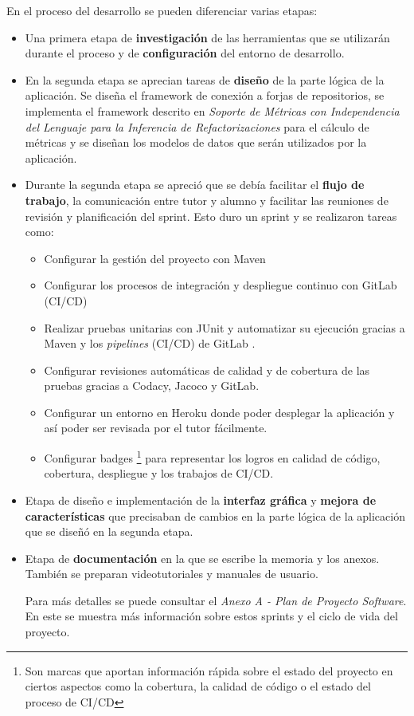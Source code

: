 En el proceso del desarrollo se pueden diferenciar varias etapas:
\begin{itemize}
	\item  Una primera etapa de \textbf{investigación} de las herramientas que se utilizarán durante el proceso y de \textbf{configuración} del entorno de desarrollo.
	\item En la segunda etapa se aprecian tareas de \textbf{diseño} de la parte lógica de la aplicación. Se diseña el framework de conexión a forjas de repositorios, se implementa el framework descrito en \textit{Soporte de Métricas con Independencia del Lenguaje para la Inferencia de Refactorizaciones}  \cite{marticorena_soporte_2005} para el cálculo de métricas y se diseñan los modelos de datos que serán utilizados por la aplicación.
	\item Durante la segunda etapa se apreció que se debía facilitar el \textbf{flujo de trabajo}, la comunicación entre tutor y alumno y facilitar las reuniones de revisión y planificación del sprint. Esto duro un sprint y se realizaron tareas como:
		\begin{itemize}
			\item Configurar la gestión del proyecto con Maven
			\item Configurar los procesos de integración y despliegue continuo con GitLab (CI/CD)
			\item Realizar pruebas unitarias con JUnit y automatizar su ejecución gracias a Maven y los \textit{pipelines} (CI/CD) de GitLab .
			\item Configurar revisiones automáticas de calidad y de cobertura de las pruebas gracias a Codacy, Jacoco y GitLab.
			\item Configurar un entorno en Heroku donde poder desplegar la aplicación y así poder ser revisada por el tutor fácilmente.
			\item Configurar badges \footnote{Son marcas que aportan información rápida sobre el estado del proyecto en ciertos aspectos como la cobertura, la calidad de código o el estado del proceso de CI/CD} para representar los logros en calidad de código, cobertura, despliegue y los trabajos de CI/CD.
		\end{itemize}
	\item Etapa  de diseño e implementación de la \textbf{interfaz gráfica} y \textbf{mejora de características} que precisaban de cambios en la parte lógica de la aplicación que se diseñó en la segunda etapa.
	\item Etapa de \textbf{documentación} en la que se escribe la memoria y los anexos. También se preparan videotutoriales y manuales de usuario.
	
	Para más detalles se puede consultar el \textit{Anexo A - Plan de Proyecto Software}. En este se muestra más información sobre estos sprints y el ciclo de vida del proyecto.
\end{itemize}

